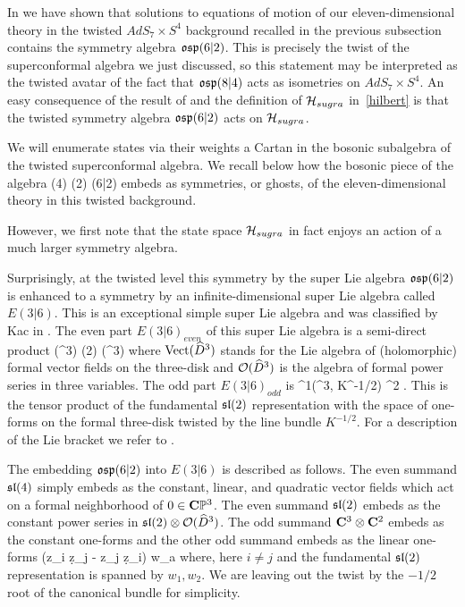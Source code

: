 In \cite{RSW} we have shown that solutions to equations of motion of our eleven-dimensional theory in the twisted $AdS_{7}\times S^{4}$ background recalled in the previous subsection contains the symmetry algebra $\mathfrak{osp}(6|2)$. This is precisely the twist of the superconformal algebra we just discussed, so this statement may be interpreted as the twisted avatar of the fact that $\mathfrak{osp}(8|4)$ acts as isometries on $AdS_{7}\times S^{4}.$ An easy consequence of the result of \cite{RSW} and the definition of $\mathcal H_{sugra}$ in~\ref{hilbert} is that the twisted symmetry algebra $\mathfrak{osp}(6|2)$ acts on $\mathcal H_{sugra}$.

We will enumerate states via their weights a Cartan in the bosonic subalgebra of the twisted superconformal algebra.
We recall below how the bosonic piece of the algebra
\beqn
\label{eqn:gut}
(4) \times {}(2) \subset {}(6|2) 
\eeqn
embeds as symmetries, or ghosts, of the eleven-dimensional theory in this twisted background.

However, we first note that the state space $\mathcal H_{sugra}$ in fact enjoys an action of a much larger symmetry algebra.

\parsec
Surprisingly, at the twisted level this symmetry by the super Lie algebra $\mathfrak{osp}(6|2)$ is enhanced to a symmetry by an infinite-dimensional super Lie algebra called $E(3|6)$. 
This is an exceptional simple super Lie algebra and was classified by Kac in \cite{KacClass}. 
The even part $E(3|6)_{even}$ of this super Lie algebra is a semi-direct product 
\beqn\label{eqn:evenE36}
\Vect(^3) \oplus {}(2) \otimes \cO(^3) 
\eeqn
where $\operatorname{Vect}(\widehat{D}^3)$ stands for the Lie algebra of (holomorphic) formal vector fields on the three-disk and $\mathcal O(\widehat{D}^3)$ is the algebra of formal power series in three variables.
The odd part $E(3|6)_{odd}$ is 
\beqn\label{eqn:oddE36}
\Omega^{1}(^3, K^{-1/2}) \otimes \C^2  .
\eeqn
This is the tensor product of the fundamental $\mathfrak{sl}(2)$ representation with the space of one-forms on the formal three-disk twisted by the line bundle $K^{-1/2}$.
For a description of the Lie bracket we refer to \cite{KacClass}.

The embedding $\mathfrak{osp}(6|2)$ into $E(3|6)$ is described as follows.
The even summand $\mathfrak{sl}(4)$ simply embeds as the constant, linear, and quadratic vector fields which act on a formal neighborhood of $0 \in \mathbf{C}\mathbb{P}^3$.
The even summand $\mathfrak{sl}(2)$ embeds as the constant power series in $\mathfrak{sl}(2) \otimes \mathcal O(\widehat{D}^3)$. 
The odd summand $\mathbf{C}^3 \otimes \mathbf{C}^2$ embeds as the constant one-forms and the other odd summand embeds as the linear one-forms 
\beqn
{} (z_i \d z_j - z_j \d z_i) \otimes w_a
\eeqn
where, here $i \ne j$ and the fundamental $\mathfrak{sl}(2)$ representation is spanned by $w_1,w_2$.
We are leaving out the twist by the $-1/2$ root of the canonical bundle for simplicity.

